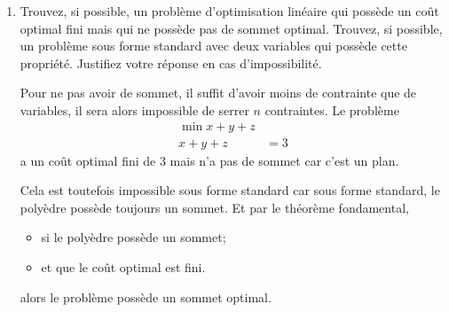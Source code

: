 \begin{enumerate}
    \begin{solution}
      Un même polyèdre peut être obtenu au moyen de
      représentations différentes.
      Si le polyèdre est identique,
      cela signifie qu'un des deux ensembles a des contraintes linéairement
      dépendantes des contraintes de l'autre ensemble.
      \begin{proof}
        Soient $A \in \R^{m \times n} $ et $B \in \R^{k \times n} $ des matrices
        telles que $Ax \geq b$ et $Bx \geq b$ représentent le même polyèdre.
        Supposons que $ k > m$ et que les lignes de $B$, à savoir,
        la suite $g_{1}, \dots, g_{k}$ n'engendrent pas $\R^{n}$.

        Dès lors, $\exists x \in \R^{n}$ tel que $x \notin \mathcal(B)$.
        Or, deux ensembles qui représentent un même polyèdre
        doivent avoir des contraintes communes.
        Il y a donc contradiction puisque, par hypothèse,
        l'espace ligne de $A$ forme une suite génératrice et $ k > m$.
        Le nombre de lignes de $B$ est donc supérieur au nombre de lignes de $A$
        et les lignes de $B$ sont linéairement dépendantes des lignes de $A$.
        La suite $g_{1}, \dots, g_{k}$ doit donc être génératrice.
      \end{proof}
    \end{solution}

  \item Trouvez, si possible, un problème d'optimisation linéaire qui possède un coût optimal fini mais qui ne possède pas de sommet optimal.
    Trouvez, si possible, un problème  sous forme standard avec deux variables qui possède cette propriété.  Justifiez votre réponse en cas
    d'impossibilité.

    \begin{solution}
      Pour ne pas avoir de sommet,
      il suffit d'avoir moins de contrainte que de variables,
      il sera alors impossible de serrer $n$ contraintes.
      Le problème
      \begin{align*}
        \min x + y + z\\
        x + y + z & = 3
      \end{align*}
      a un coût optimal fini de 3 mais n'a pas de sommet car c'est un plan.

      Cela est toutefois impossible sous forme standard car
      sous forme standard, le polyèdre possède toujours un sommet.
      Et par le théorème fondamental,
      \begin{itemize}
        \item si le polyèdre possède un sommet;
        \item et que le coût optimal est fini.
      \end{itemize}
      alors le problème possède un sommet optimal.
    \end{solution}


\end{enumerate}
